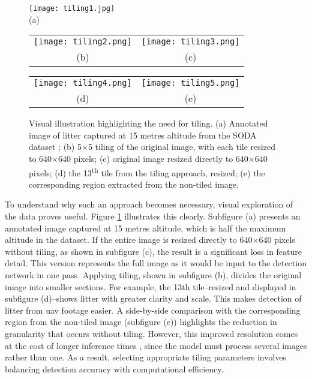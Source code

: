 \begin{figure}[!htbp]
  \centering

  \texttt{[image: tiling1.jpg]} \\
  \small (a)

  \vspace{1em}

  \begin{tabular}{cc}
    \texttt{[image: tiling2.png]} &
    \texttt{[image: tiling3.png]} \\
    \small (b) & \small (c) \\
  \end{tabular}

  \vspace{1em}

  \begin{tabular}{cc}
    \texttt{[image: tiling4.png]} &
    \texttt{[image: tiling5.png]} \\
    \small (d) & \small (e) \\
  \end{tabular}

  \caption{Visual illustration highlighting the need for tiling. (a) Annotated image of litter captured at 15 metres altitude from the SODA dataset \cite{soda_dataset}; (b) 5$\times$5 tiling of the original image, with each tile resized to 640$\times$640 pixels; (c) original image resized directly to 640$\times$640 pixels; (d) the 13\textsuperscript{th} tile from the tiling approach, resized; (e) the corresponding region extracted from the non-tiled image.}

  \label{fig:tiling_examples}
\end{figure}

To understand why such an approach becomes necessary, visual exploration of the data proves useful. Figure \ref{fig:tiling_examples} illustrates this clearly. Subfigure (a) presents an annotated image captured at 15 metres altitude, which is half the maximum altitude in the dataset. If the entire image is resized directly to 640$\times$640 pixels without tiling, as shown in subfigure (c), the result is a significant loss in feature detail. This version represents the full image as it would be input to the detection network in one pass.
Applying tiling, shown in subfigure (b), divides the original image into smaller sections. For example, the 13th tile--resized and displayed in subfigure (d)--shows litter with greater clarity and scale. This makes detection of litter from \gls{uav} footage easier. A side-by-side comparison with the corresponding region from the non-tiled image (subfigure (e)) highlights the reduction in granularity that occurs without tiling.
However, this improved resolution comes at the cost of longer inference times \cite{tiling}, since the model must process several images rather than one. As a result, selecting appropriate tiling parameters involves balancing detection accuracy with computational efficiency.

